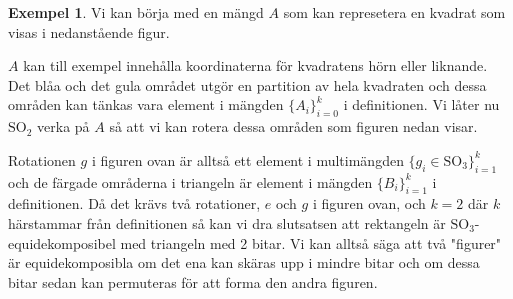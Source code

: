 \documentclass{article}
\theoremstyle{definition}
\newtheorem{exmp}[thm]{Exempel}
\begin{document}
\begin{exmp}
  Vi kan börja med en mängd $A$ som kan represetera en kvadrat som visas i nedanstående figur. 

  \begin{center}
  \end{center}
  $A$ kan till exempel innehålla koordinaterna för kvadratens hörn eller liknande. Det blåa och det gula området utgör en partition av 
  hela kvadraten och dessa områden kan tänkas vara element i mängden $\{A_i\}_{i = 0}^k$ i definitionen. Vi låter nu 
  $\text{SO}_2$ verka på $A$ så att vi kan rotera dessa områden som figuren nedan visar.

  \begin{center}
    \quad
  \end{center}
  Rotationen $g$ i figuren ovan är alltså ett element i multimängden $\{g_i \in \text{SO}_3\}_{i = 1}^k$ och
  de färgade områderna i triangeln är element i mängden $\{B_i\}_{i = 1}^k$ i definitionen. Då det krävs två rotationer, $e$ och $g$ i figuren ovan, 
  och $k = 2$ där $k$ härstammar från definitionen så kan vi dra slutsatsen att rektangeln är $\text{SO}_3$-equidekomposibel med triangeln med 2 bitar. 
  Vi kan alltså säga att två "figurer" är equidekomposibla om det ena kan skäras upp i mindre bitar och om dessa bitar sedan kan permuteras för att 
  forma den andra figuren.
\end{exmp}
\end{document}
